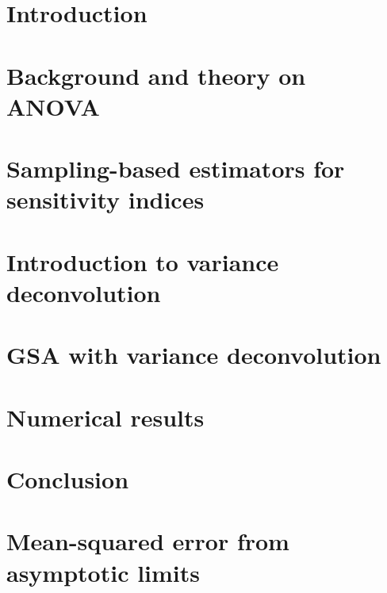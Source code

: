 \documentclass[final,3p,times,dvipsnames]{elsarticle}
\begin{document}
\section{Introduction}
\label{sec:intro}



\section{Background and theory on ANOVA}
\label{sec:anova}



\section{Sampling-based estimators for sensitivity indices}
\label{sec:sampling}



\section{Introduction to variance deconvolution}
\label{sec:deconvolution}



\section{GSA with variance deconvolution}
\label{sec:gsa-deconvolution}



\section{Numerical results}
\label{sec:results}



\section{Conclusion}
\label{sec:conclusion}



\section{Mean-squared error from asymptotic limits}
\label{appx:mse}





\end{document}
